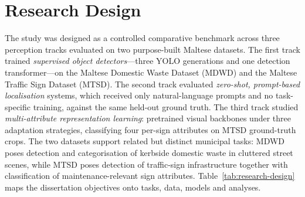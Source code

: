 \section{Research Design}
\label{sec:research-design}

The study was designed as a controlled comparative benchmark across three perception tracks evaluated on two purpose-built Maltese datasets. The first track trained \emph{supervised object detectors}---three YOLO generations and one detection transformer---on the Maltese Domestic Waste Dataset (MDWD) and the Maltese Traffic Sign Dataset (MTSD). The second track evaluated \emph{zero-shot, prompt-based localisation} systems, which received only natural-language prompts and no task-specific training, against the same held-out ground truth. The third track studied \emph{multi-attribute representation learning}: pretrained visual backbones under three adaptation strategies, classifying four per-sign attributes on MTSD ground-truth crops. The two datasets support related but distinct municipal tasks: MDWD poses detection and categorisation of kerbside domestic waste in cluttered street scenes, while MTSD poses detection of traffic-sign infrastructure together with classification of maintenance-relevant sign attributes. Table~\ref{tab:research-design} maps the dissertation objectives onto tasks, data, models and analyses.

